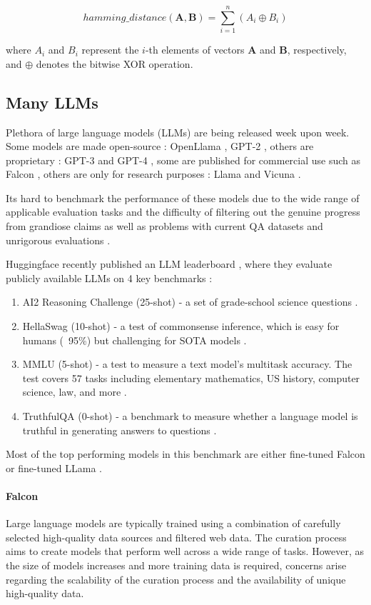 \documentclass[a4paper,12pt]{article}
\begin{document}
$$
hamming\_distance(\mathbf{A}, \mathbf{B}) = \sum_{i=1}^{n} (A_i \oplus B_i)
$$

where $A_i$ and $B_i$ represent the $i$-th elements of vectors $\mathbf{A}$ and $\mathbf{B}$, respectively, and $\oplus$ denotes the bitwise XOR operation.

\subsection{Many LLMs}
Plethora of large language models (LLMs) are being released week upon week. Some models are made open-source : OpenLlama \cite{openllama}, GPT-2 \cite{gpt2}, others are proprietary : GPT-3\cite{gpt3} and GPT-4 \cite{gpt4}, some are published for commercial use such as Falcon \cite{falcon}, others are only for research purposes : Llama \cite{llama} and Vicuna \cite{vicuna}.

Its hard to benchmark the performance of these models due to the wide range of applicable evaluation tasks and the difficulty of filtering out the genuine progress from grandiose claims as well as problems with current QA datasets and unrigorous evaluations \cite{unfairdataset}.

Huggingface recently published an LLM leaderboard \cite{open-llm-leaderboard}, where they evaluate publicly available LLMs on 4 key benchmarks : 

\begin{enumerate}
    \item AI2 Reasoning Challenge (25-shot) - a set of grade-school science questions \cite{AI2}.
    \item HellaSwag (10-shot) - a test of commonsense inference, which is easy for humans (~95\%) but challenging for SOTA models \cite{hellaswag}. 
    \item MMLU (5-shot) - a test to measure a text model’s multitask accuracy. The test covers 57 tasks including elementary mathematics, US history, computer science, law, and more \cite{MMLU}.
    \item TruthfulQA (0-shot) - a benchmark to measure whether a language model is truthful in generating answers to questions \cite{truthfulqa}.
\end{enumerate}

Most of the top performing models in this benchmark are either fine-tuned Falcon \cite{falcon} or fine-tuned LLama \cite{llama}.

\paragraph*{Falcon}
Large language models are typically trained using a combination of carefully selected high-quality data sources and filtered web data. 
The curation process aims to create models that perform well across a wide range of tasks. 
However, as the size of models increases and more training data is required, concerns arise regarding the scalability of the curation process and the availability of unique high-quality data.
\end{document}
